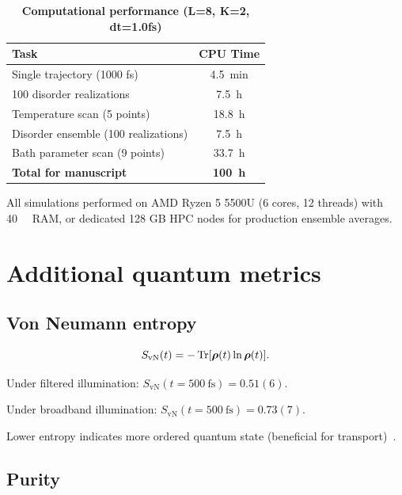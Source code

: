 \documentclass[11pt,a4paper]{article}
\begin{document}
\begin{table}[h]
\centering
\caption{\textbf{Computational performance (L=8, K=2, dt=1.0fs)}}
\label{tab:SI_performance}
\begin{tabular}{lc}
\toprule
\textbf{Task} & \textbf{CPU Time} \\
\midrule
Single trajectory (1000 fs) & \SI{4.5}{\minute} \\
100 disorder realizations & \SI{7.5}{\hour} \\
Temperature scan (5 points) & \SI{18.8}{\hour} \\
Disorder ensemble (100 realizations) & \SI{7.5}{\hour} \\
Bath parameter scan (9 points) & \SI{33.7}{\hour} \\
\midrule
\textbf{Total for manuscript} & \textbf{\SI{100}{\hour}} \\
\bottomrule
\end{tabular}
\end{table}

All simulations performed on AMD Ryzen 5 5500U (6 cores, 12 threads) with \SI{40}{\giga\byte} RAM, or dedicated 128 GB HPC nodes for production ensemble averages.


\section{Additional quantum metrics}

\subsection{Von Neumann entropy}

\begin{equation}
S_{\mathrm{vN}}(t) = -\Tr[\vb*{\rho}(t)\ln\vb*{\rho}(t)].
\label{eq:SI_von_neumann}
\end{equation}

Under filtered illumination: $S_{\mathrm{vN}}(t=\SI{500}{\femto\second}) = 0.51(6)$.

Under broadband illumination: $S_{\mathrm{vN}}(t=\SI{500}{\femto\second}) = 0.73(7)$.

Lower entropy indicates more ordered quantum state (beneficial for transport)~\cite{Cao2020}.

\subsection{Purity}
\end{document}
